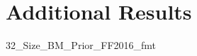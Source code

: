 
\section{Additional Results} \label{sec:addl_results}

\begin{landscape}

\begin{table}%
  \scriptsize
  \centering
  \caption{32 Size, value and investment sorts -- 1963-07 through 2016-12}%
  \qquad
\end{table}

\end{landscape}

\begin{landscape}
{32_Size_BM_Prior_FF2016_fmt}
\end{landscape}

